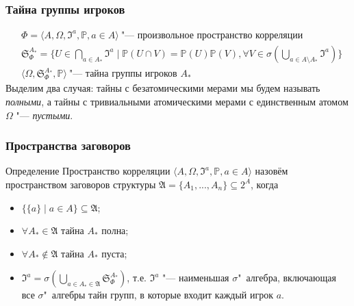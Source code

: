 \begin{frame}
    \frametitle{Тайна группы игроков}
    \begin{align*}
    	&\Phi = \langle A, \Omega, \mathfrak{I}^a, \mathbb{P}, a \in A \rangle\ \text{"--- произвольное пространство корреляции} \\
    	&\mathfrak{S}_\Phi^{A_*} = \{U \in \bigcap\limits_{a \in A_*} \mathfrak{I}^a \mid \mathbb{P}(U \cap V) = \mathbb{P}(U) \mathbb{P}(V), \forall V \in \sigma(\bigcup\limits_{a \in A \setminus A_*} \mathfrak{I}^a)\} \\
    	&\langle \Omega, \mathfrak{S}_\Phi^{A_*}, \mathbb{P} \rangle\ \text{"--- тайна группы игроков $A_*$}
    \end{align*}
	Выделим два случая: тайны с безатомическими мерами мы будем называть \emph{полными}, а тайны с тривиальными атомическими мерами с единственным атомом $\Omega$ "--- \emph{пустыми}.
\end{frame}

\begin{frame}
	\frametitle{Пространства заговоров}
	\begin{block}{Определение}
		Пространство корреляции $\langle A, \Omega, \mathfrak{I}^a, \mathbb{P}, a \in A \rangle$ назовём пространством заговоров структуры $\mathfrak{A} = \{A_1, ..., A_n\} \subseteq 2^A$, когда
		\begin{itemize}
			\item $\{\{a\} \mid a \in A\} \subseteq \mathfrak{A}$;
			\item $\forall A_* \in \mathfrak{A}$ тайна $A_*$ полна;
			\item $\forall A_* \notin \mathfrak{A}$ тайна $A_*$ пуста;
			\item $\mathfrak{I}^a = \sigma(\bigcup\limits_{a \in A_* \in \mathfrak{A}}\mathfrak{S}_\Phi^{A_*})$, т.е. $\mathfrak{I}^a$ "--- наименьшая $\sigma$"~алгебра, включающая все $\sigma$"~алгебры тайн групп, в которые входит каждый игрок $a$.
		\end{itemize}
	\end{block}
\end{frame}

